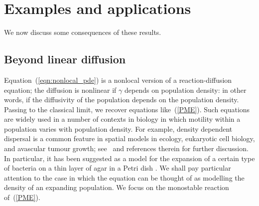 \documentclass[12pt]{article}
\numberwithin{equation}{section}
\begin{document}
\section{Examples and applications}
\label{sec:applications}

We now discuss some consequences of these results.

\subsection{Beyond linear diffusion}
\label{beyond linear diffusion}

Equation~(\ref{eqn:nonlocal_pde}) is a nonlocal version of a reaction-diffusion equation;
the diffusion is nonlinear if $\gamma$ depends on population density:
in other words, if the diffusivity of the population depends on the population density.
Passing to the classical limit, we recover equations like~(\ref{PME}).
Such equations are widely used in a number of contexts in biology in which
motility within a population varies with population density.
For example, density dependent dispersal is a common feature in spatial
models in ecology, eukaryotic cell biology, and avascular tumour growth;
see~\cite{sherratt:2010} and references therein for further discussion. 
In particular, it has been suggested as a model for
the expansion of a certain type of bacteria %
on a thin layer of agar in a Petri dish 
\citep{cohen/golding/kozlovsky/benjacob/ron:1999}. 
We shall pay particular attention to the case in which the equation can be 
thought of as modelling the density of an expanding population. 
We focus on the monostable reaction of~(\ref{PME}).
\end{document}
